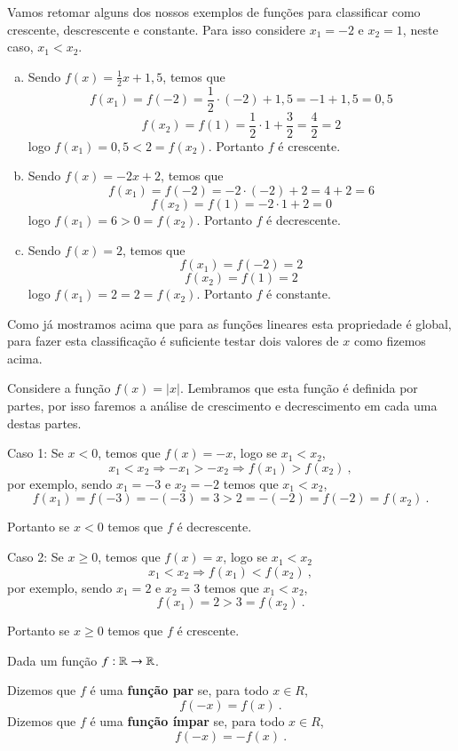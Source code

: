  \begin{exem}
 Vamos retomar alguns dos nossos exemplos de funções para classificar como crescente, descrescente e constante. Para isso considere $x_1= -2$ e $x_2= 1$, neste caso, $x_1 < x_2$. 
  \begin{enumerate}[a)]
   \item Sendo $f(x)= \frac{1}{2}x + 1,5$, temos que 
   \[f(x_1)= f(-2)= \frac{1}{2}\cdot (-2) + 1,5= -1 + 1,5= 0,5\]
   \[f(x_2)= f(1)= \frac{1}{2} \cdot 1+\frac{3}{2}= \frac{4}{2}= 2\]
   logo $f(x_1)= 0,5 < 2= f(x_2)$. Portanto $f$ é crescente.
   \item Sendo $f(x)= -2x + 2$, temos que
   \[f(x_1)= f(-2)= -2 \cdot (-2) + 2= 4 + 2= 6\]
   \[f(x_2)= f(1)= -2 \cdot 1 + 2= 0\]
   logo $f(x_1)= 6 > 0 = f(x_2)$. Portanto $f$ é decrescente.
   \item Sendo $f(x)= 2$, temos que 
   \[f(x_1)= f(-2)= 2\]
   \[f(x_2)= f(1)= 2\]
   logo $f(x_1)= 2 = 2= f(x_2)$. Portanto $f$ é constante.
  \end{enumerate}
  Como já mostramos acima que para as funções lineares esta propriedade é global, para fazer esta classificação é suficiente testar dois valores de $x$ como fizemos acima.

 \end{exem}
 
 \begin{exem}
  Considere a função $f(x)= |x|$. Lembramos que esta função é definida por partes, por isso faremos a análise de crescimento e decrescimento em cada uma destas partes.
  
  Caso 1: Se $x < 0$, temos que $f(x)= -x$, logo se $x_1 < x_2$,
  \[x_1 < x_2 \Rightarrow -x_1 > -x_2 \Rightarrow f(x_1) > f(x_2) \ ,\]
  por exemplo, sendo $x_1= -3$ e $x_2= -2$ temos que $x_1 < x_2$,
  \[f(x_1)= f(-3)= -(-3)= 3 > 2= -(-2)= f(-2)= f(x_2) \ .\]
  
  Portanto se $x < 0$ temos que $f$ é decrescente.
  
  Caso 2: Se $x \geq 0$, temos que $f(x)= x$, logo se $x_1 < x_2$
  \[x_1 < x_2 \Rightarrow  f(x_1) < f(x_2) \ ,\]
  por exemplo, sendo $x_1= 2$ e $x_2= 3$ temos que $x_1 < x_2$,
  \[f(x_1)= 2 > 3= f(x_2) \ .\]
  
  Portanto se $x \geq 0$ temos que $f$ é crescente.
 \end{exem}


 
 \vskip0.3cm
 \colorbox{azul}{
 \begin{minipage}{0.9\linewidth}
 \begin{center}
  Dada um função $f: \mathbb{R} \rightarrow \mathbb{R}$. 
  
  Dizemos que $f$ é uma \textbf{função par} se, para todo $x \in R$,
  \[f(-x)= f(x) \ .\]
  Dizemos que $f$ é uma \textbf{função ímpar} se, para todo $x \in R$,
  \[f(-x)= - f(x) \ .\]
 \end{center}
 \end{minipage}}
 \vskip0.3cm

